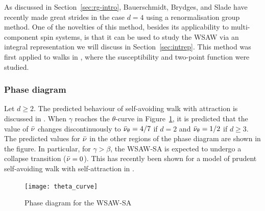As discussed in Section~\ref{sec:rg-intro}, Bauerschmidt, Brydges, and Slade have
recently made great strides in the case $d = 4$ using a renormalisation group method.
One of the novelties of this method, besides its applicability to multi-component
spin systems, is that it can be used to study the WSAW via an integral representation
we will discuss in Section~\ref{sec:intrep}. This method was first applied to walks
in \cite{BBS-saw4-log,BBS-saw4}, where the susceptibility and two-point function were
studied.

\subsubsection{Phase diagram}

Let $d \ge 2$. The predicted behaviour of self-avoiding walk with attraction is discussed
in \cite{Vand98}.
When $\gamma$ reaches the $\theta$-curve in Figure~\ref{fig:theta-curve}, it is predicted
that the value of $\bar\nu$ changes discontinuously to $\bar\nu_\theta = 4/7$ if $d = 2$
and $\bar\nu_\theta = 1/2$ if $d \ge 3$. The predicted values for $\bar\nu$
in the other regions of the phase diagram are shown in the figure. In particular, for
$\gamma > \beta$, the WSAW-SA is expected to undergo a collapse transition ($\bar\nu = 0$).
This has recently been shown for a model of prudent self-avoiding walk with self-attraction
in \cite{PT16}.

\begin{figure}[!htb]
\centering
\texttt{[image: theta\_curve]}
\caption[Phase diagram of WSAW-SA]{Phase diagram for the WSAW-SA}
\label{fig:theta-curve}
\end{figure}

